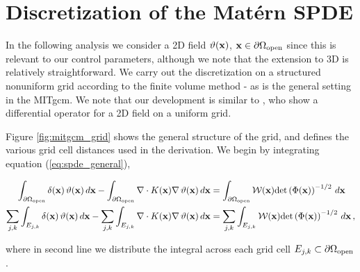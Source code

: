 \section{Discretization of the Mat\'ern SPDE}
\label{sec:discretization_matern}

In the following analysis we consider a 2D field
$\vartheta(\mathbf{x})$, $\mathbf{x}\in\partial\Omega_{\text{open}}$ since this is
relevant to our control parameters, although we note that the
extension to 3D is relatively straightforward.
We carry out the discretization on a structured nonuniform grid according to the
finite volume method - as is the general setting in the MITgcm.
We note that our development is similar to \citet{fuglstad_exploring_2015},
who show a differential operator for a 2D field on a uniform grid.

Figure \ref{fig:mitgcm_grid} shows the general structure of the grid, and
defines the various grid cell distances used in the derivation.
We begin by integrating equation (\ref{eq:spde_general}),
\begin{linenomath}\begin{equation}
    \begin{aligned}
        \int_{\partial\Omega_{\text{open}}} \delta(\mathbf{x})\,\vartheta(\mathbf{x})\, d\mathbf{x} -
        \int_{\partial\Omega_{\text{open}}} \nabla\cdot K(\mathbf{x})\nabla\,\vartheta(\mathbf{x})\,d\mathbf{x}
        &=
        \int_{\partial\Omega_{\text{open}}} \mathcal{W}(\mathbf{x})\text{det}\left(\Phi(\mathbf{x})\right)^{-1/2} \, d\mathbf{x} \\
        \sum_{{j,k}}\int_{E_{j,k}} \delta(\mathbf{x})\,\vartheta(\mathbf{x})\, d\mathbf{x} -
        \sum_{{j,k}}\int_{E_{j,k}} \nabla\cdot K(\mathbf{x})\nabla\,\vartheta(\mathbf{x})\,d\mathbf{x}
        &=
        \sum_{{j,k}}\int_{E_{j,k}} \mathcal{W}(\mathbf{x})\text{det}\left(\Phi(\mathbf{x})\right)^{-1/2} \, d\mathbf{x} \, ,
    \end{aligned}
    \label{eq:spde_integral}
\end{equation}\end{linenomath}
where in second line we distribute the integral across each grid cell
$E_{j,k}\subset\partial\Omega_{\text{open}}$.

